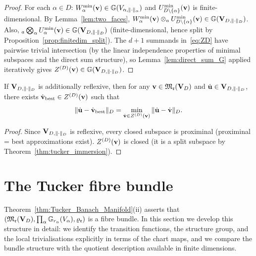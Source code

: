 \begin{proof}
For each $\alpha \in D$: $W^{\min}_{\alpha}(\mathbf{v}) \in
\mathbb{G}(V_{\alpha,\|\cdot\|_\alpha})$ and $U^{\min}_{D\setminus\{\alpha\}}(\mathbf{v})$
is finite-dimensional. By Lemma~\ref{lem:two_faces},
$W^{\min}_{\alpha}(\mathbf{v}) \otimes_a U^{\min}_{D\setminus\{\alpha\}}(\mathbf{v})
\in \mathbb{G}(\mathbf{V}_{D,\|\cdot\|_D})$.
Also, ${}_a\bigotimes_\alpha U^{\min}_{\alpha}(\mathbf{v}) \in \mathbb{G}(\mathbf{V}_{D,\|\cdot\|_D})$
(finite-dimensional, hence split by
Proposition~\ref{prop:finitedim_split}).
The $d+1$ summands in~\eqref{eq:ZD} have pairwise trivial intersection
(by the linear independence properties of minimal subspaces
and the direct sum structure), so Lemma~\ref{lem:direct_sum_G}
applied iteratively gives $Z^{(D)}(\mathbf{v}) \in \mathbb{G}(\mathbf{V}_{D,\|\cdot\|_D})$.
\end{proof}

\begin{corollary}
\label{cor:best_proj_tangent}
If $\mathbf{V}_{D,\|\cdot\|_D}$ is additionally reflexive, then for any $\mathbf{v} \in
\mathfrak{M}_{\mathfrak{r}}(\mathbf{V}_D)$ and $\dot{\mathbf{u}} \in \mathbf{V}_{D,\|\cdot\|_D}$, there exists
$\dot{\mathbf{v}}_\mathrm{best} \in Z^{(D)}(\mathbf{v})$ such that
\begin{equation*}
    \|\dot{\mathbf{u}} - \dot{\mathbf{v}}_\mathrm{best}\|_D
    = \min_{\dot{\mathbf{v}} \in Z^{(D)}(\mathbf{v})} \|\dot{\mathbf{u}} - \dot{\mathbf{v}}\|_D.
\end{equation*}
\end{corollary}

\begin{proof}
Since $\mathbf{V}_{D,\|\cdot\|_D}$ is reflexive, every closed subspace is proximinal
(proximinal = best approximations exist). $Z^{(D)}(\mathbf{v})$ is closed
(it is a split subspace by Theorem~\ref{thm:tucker_immersion}).
\end{proof}

\section{The Tucker fibre bundle}
\label{sec:tucker_manifold:bundle}

Theorem~\ref{thm:Tucker_Banach_Manifold}(ii) asserts that
$(\mathfrak{M}_{\mathfrak{r}}(\mathbf{V}_D), \prod_\alpha \mathbb{G}_{r_\alpha}(V_\alpha),
\varrho_{\mathfrak{r}})$ is a fibre bundle. In this section we develop this
structure in detail: we identify the transition functions, the
structure group, and the local trivialisations explicitly in terms
of the chart maps, and we compare the bundle structure with the
quotient description available in finite dimensions.

